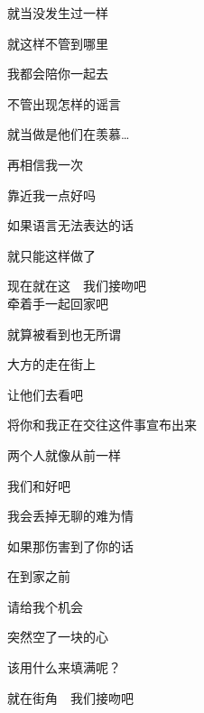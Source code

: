 就当没发生过一样

就这样不管到哪里

我都会陪你一起去

不管出现怎样的谣言

就当做是他们在羡慕…

再相信我一次

靠近我一点好吗

如果语言无法表达的话

就只能这样做了

现在就在这　我们接吻吧
\\

牵着手一起回家吧

就算被看到也无所谓

大方的走在街上

让他们去看吧

将你和我正在交往这件事宣布出来

两个人就像从前一样

我们和好吧

我会丢掉无聊的难为情

如果那伤害到了你的话

在到家之前

请给我个机会

突然空了一块的心

该用什么来填满呢？

就在街角　我们接吻吧
\\

